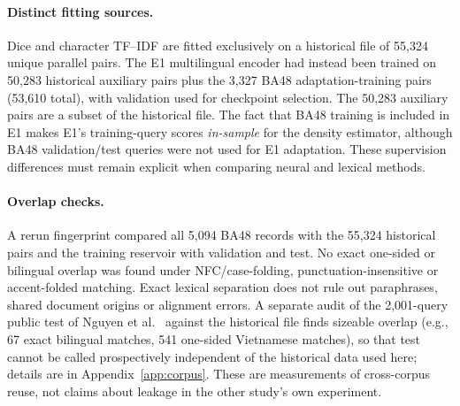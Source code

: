 \paragraph{Distinct fitting sources.} Dice and character TF--IDF are fitted exclusively on a historical file of 55,324 unique parallel pairs. The E1 multilingual encoder had instead been trained on 50,283 historical auxiliary pairs plus the 3,327 BA48 adaptation-training pairs (53,610 total), with validation used for checkpoint selection. The 50,283 auxiliary pairs are a subset of the historical file. The fact that BA48 training is included in E1 makes E1's training-query scores \emph{in-sample} for the density estimator, although BA48 validation/test queries were not used for E1 adaptation. These supervision differences must remain explicit when comparing neural and lexical methods.

\paragraph{Overlap checks.} A rerun fingerprint compared all 5,094 BA48 records with the 55,324 historical pairs and the training reservoir with validation and test. No exact one-sided or bilingual overlap was found under NFC/case-folding, punctuation-insensitive or accent-folded matching. Exact lexical separation does not rule out paraphrases, shared document origins or alignment errors. A separate audit of the 2,001-query public test of Nguyen et al.~\cite{nguyen2026parallelretrieval} against the historical file finds sizeable overlap (e.g., 67 exact bilingual matches, 541 one-sided Vietnamese matches), so that test cannot be called prospectively independent of the historical data used here; details are in Appendix~\ref{app:corpus}. These are measurements of cross-corpus reuse, not claims about leakage in the other study's own experiment.
